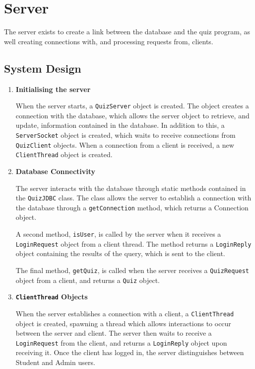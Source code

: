 \section{Server}
\label{sec:server}

The server exists to create a link between the database and the quiz program,
as well creating connections with, and processing requests from, clients.

\subsection{System Design}
\label{sub:system_design}

\begin{enumerate}
	\item \textbf{Initialising the server}

	When the server starts, a \texttt{QuizServer} object is created. The object
	creates a connection with the database, which allows the server object to
	retrieve, and update, information contained in the database.  In addition
	to this, a \texttt{ServerSocket} object is created, which waits to receive
	connections from \texttt{QuizClient} objects. When a connection from a
	client is received, a new \texttt{ClientThread} object is created.

	\item \textbf{Database Connectivity}

	The server interacts with the database through static methods contained in
	the \texttt{QuizJDBC} class.  The class allows the server to establish a
	connection with the database through a \texttt{getConnection} method, which
	returns a Connection object.

	A second method, \texttt{isUser}, is called by the server when it receives
	a \texttt{LoginRequest} object from a client thread. The method returns a
	\texttt{LoginReply} object containing the results of the query, which is
	sent to the client.

	The final method, \texttt{getQuiz}, is called when the server receives a
	\texttt{QuizRequest} object from a client, and returns a \texttt{Quiz}
	object.

	\item \textbf{\texttt{ClientThread} Objects}

	When the server establishes a connection with a client, a
	\texttt{ClientThread} object is created, spawning a thread which allows
	interactions to occur between the server and  client. The server then waits
	to receive a \texttt{LoginRequest} from the client, and returns a
	\texttt{LoginReply} object upon receiving it.  Once the client has logged in,
	the server distinguishes between Student and Admin users.


\end{enumerate}
